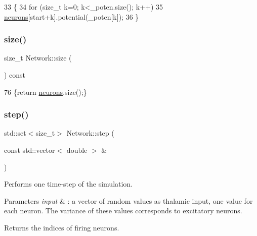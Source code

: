 \begin{DoxyCode}
33                                                                             \{
34     \textcolor{keywordflow}{for} (\textcolor{keywordtype}{size\_t} k=0; k<\_poten.size(); k++) 
35         \hyperlink{classNetwork_a1b7832bc2c7b8855cdc3b2d6329eff9d}{neurons}[start+k].potential(\_poten[k]);
36 \}
\end{DoxyCode}
\mbox{\label{classNetwork_a41c54d12d861883170b5c5abca3a7bc8}} 
\subsubsection{\texorpdfstring{size()}{size()}}
{\footnotesize\ttfamily size\+\_\+t Network\+::size (\begin{DoxyParamCaption}{ }\end{DoxyParamCaption}) const\hspace{0.3cm}{\ttfamily [inline]}}


\begin{DoxyCode}
76 \{\textcolor{keywordflow}{return} \hyperlink{classNetwork_a1b7832bc2c7b8855cdc3b2d6329eff9d}{neurons}.size();\}
\end{DoxyCode}
\mbox{\label{classNetwork_a53665a3a69e6ec894c313d0ce3fb7f34}} 
\subsubsection{\texorpdfstring{step()}{step()}}
{\footnotesize\ttfamily std\+::set$<$size\+\_\+t$>$ Network\+::step (\begin{DoxyParamCaption}\item[{const std\+::vector$<$ double $>$ \&}]{ }\end{DoxyParamCaption})}

Performs one time-\/step of the simulation. 
\begin{DoxyParams}{Parameters}
{\em input} & \+: a vector of random values as thalamic input, one value for each neuron. The variance of these values corresponds to excitatory neurons. \\
\hline
\end{DoxyParams}
\begin{DoxyReturn}{Returns}
the indices of firing neurons. 
\end{DoxyReturn}


